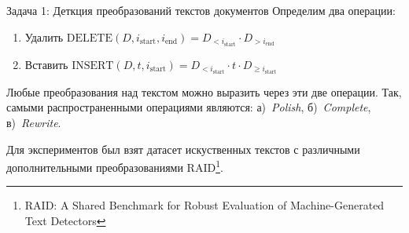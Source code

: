 \documentclass{beamer}
\begin{document}
\begin{frame}{Задача 1: Деткция преобразований текстов документов}
    Определим два операции:
    \begin{enumerate}
        \item Удалить $\text{DELETE}(D, i_{\text{start}}, i_{\text{end}}) = D_{<i_{\text{start}}}\cdot D_{>i_{\text{end}}}$
        \item Вставить $\text{INSERT}(D, t, i_{\text{start}}) = D_{<i_{\text{start}}}\cdot t\cdot  D_{\geq i_{\text{start}}}$
    \end{enumerate}
    Любые преобразования над текстом можно выразить через эти две операции. Так, самыми распространенными операциями являются: а)~\textit{Polish}, б)~\textit{Complete}, в)~\textit{Rewrite}.

    Для экспериментов был взят датасет искуственных текстов с различными дополнительными преобразованиями RAID\footnote{RAID: A Shared Benchmark for Robust Evaluation of Machine-Generated Text Detectors}.
\end{frame}



\end{document}
